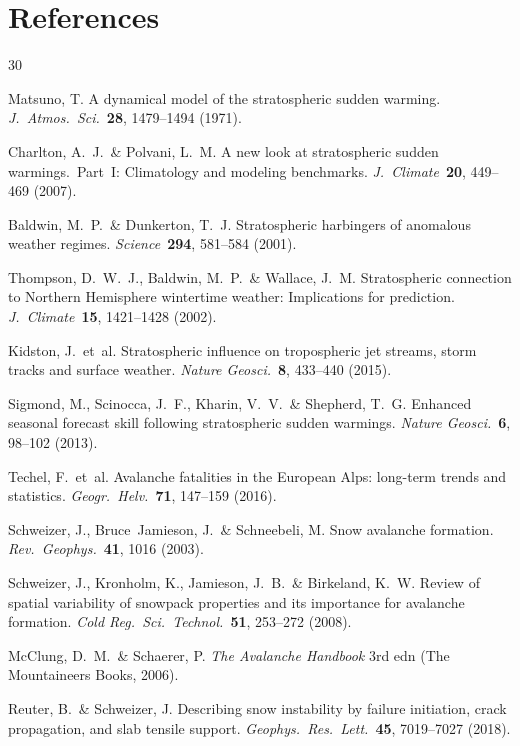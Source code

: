 \documentclass[11pt,letterpaper]{article}
\begin{document}
\clearpage
\section*{References}
\begin{thebibliography}{30}

Matsuno, T. A dynamical model of the stratospheric sudden warming. \textit{J.\ Atmos.\ Sci.}\ \textbf{28}, 1479--1494 (1971).

Charlton, A.~J.\ \& Polvani, L.~M. A new look at stratospheric sudden warmings.\ Part~I: Climatology and modeling benchmarks. \textit{J.\ Climate}\ \textbf{20}, 449--469 (2007).

Baldwin, M.~P.\ \& Dunkerton, T.~J. Stratospheric harbingers of anomalous weather regimes. \textit{Science}\ \textbf{294}, 581--584 (2001).

Thompson, D.~W.~J., Baldwin, M.~P.\ \& Wallace, J.~M. Stratospheric connection to Northern Hemisphere wintertime weather: Implications for prediction. \textit{J.\ Climate}\ \textbf{15}, 1421--1428 (2002).

Kidston, J.\ et~al. Stratospheric influence on tropospheric jet streams, storm tracks and surface weather. \textit{Nature Geosci.}\ \textbf{8}, 433--440 (2015).

Sigmond, M., Scinocca, J.~F., Kharin, V.~V.\ \& Shepherd, T.~G. Enhanced seasonal forecast skill following stratospheric sudden warmings. \textit{Nature Geosci.}\ \textbf{6}, 98--102 (2013).

Techel, F.\ et~al. Avalanche fatalities in the European Alps: long-term trends and statistics. \textit{Geogr.\ Helv.}\ \textbf{71}, 147--159 (2016).

Schweizer, J., Bruce~Jamieson, J.\ \& Schneebeli, M. Snow avalanche formation. \textit{Rev.\ Geophys.}\ \textbf{41}, 1016 (2003).

Schweizer, J., Kronholm, K., Jamieson, J.~B.\ \& Birkeland, K.~W. Review of spatial variability of snowpack properties and its importance for avalanche formation. \textit{Cold Reg.\ Sci.\ Technol.}\ \textbf{51}, 253--272 (2008).

McClung, D.~M.\ \& Schaerer, P. \textit{The Avalanche Handbook} 3rd edn (The Mountaineers Books, 2006).

Reuter, B.\ \& Schweizer, J. Describing snow instability by failure initiation, crack propagation, and slab tensile support. \textit{Geophys.\ Res.\ Lett.}\ \textbf{45}, 7019--7027 (2018).


\end{thebibliography}
\end{document}
